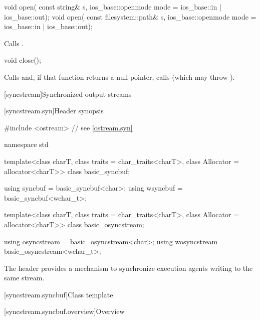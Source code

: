 %
\begin{itemdecl}
void open(
  const string& s,
  ios_base::openmode mode = ios_base::in | ios_base::out);
void open(
  const filesystem::path& s,
  ios_base::openmode mode = ios_base::in | ios_base::out);
\end{itemdecl}

\begin{itemdescr}
\pnum
\effects
Calls .
\end{itemdescr}

%
\begin{itemdecl}
void close();
\end{itemdecl}

\begin{itemdescr}
\pnum
\effects
Calls
and, if that function
returns a null pointer,
calls
(which may throw
).
\end{itemdescr}

[syncstream]{Synchronized output streams}

[syncstream.syn]{Header  synopsis}

%
%
%
%
%
\begin{codeblock}
#include <ostream>  // see \ref{ostream.syn}

namespace std {
  template<class charT, class traits = char_traits<charT>, class Allocator = allocator<charT>>
    class basic_syncbuf;

  using syncbuf = basic_syncbuf<char>;
  using wsyncbuf = basic_syncbuf<wchar_t>;

  template<class charT, class traits = char_traits<charT>, class Allocator = allocator<charT>>
    class basic_osyncstream;

  using osyncstream = basic_osyncstream<char>;
  using wosyncstream = basic_osyncstream<wchar_t>;
}
\end{codeblock}

\pnum
The header  provides a mechanism
to synchronize execution agents writing to the same stream.

[syncstream.syncbuf]{Class template }

[syncstream.syncbuf.overview]{Overview}


